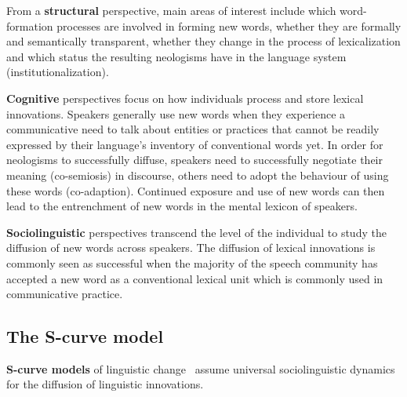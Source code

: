 \documentclass[
  a4paper,
  abstract=on,
  captions=tableabove
  ]{scrartcl}
\renewcommand{\hw}[1]{\textbf{#1}}
\begin{document}
  From a \hw{structural} perspective, main areas of interest include which word-formation processes are involved in forming new words, whether they are formally and semantically transparent, whether they change in the process of lexicalization and which status the resulting neologisms have in the language system (institutionalization). \parencite[e.g.][]{Bauer1983EnglishWordformation, Lipka2005LexicalizationInstitutionalization}

  \hw{Cognitive} perspectives focus on how individuals process and store lexical innovations. Speakers generally use new words when they experience a communicative need to talk about entities or practices that cannot be readily expressed by their language's inventory of conventional words yet. In order for neologisms to successfully diffuse, speakers need to successfully negotiate their meaning (co-semiosis) in discourse, others need to adopt the behaviour of using these words (co-adaption). Continued exposure and use of new words can then lead to the entrenchment of new words in the mental lexicon of speakers.~\parencite{Schmid2008NewWords}

  \hw{Sociolinguistic} perspectives transcend the level of the individual to study the diffusion of new words across speakers. The diffusion of lexical innovations is commonly seen as successful when the majority of the speech community has accepted a new word as a conventional lexical unit which is commonly used in communicative practice.


  \subsection{The S-curve model}
    \label{subsec:s-curve-model}

  \hw{S-curve models} of linguistic change~\parencite{Milroy1992LinguisticVariation, Nevalainen2015DescriptiveAdequacy, Labov2007TransmissionDiffusion} assume universal sociolinguistic dynamics for the diffusion of linguistic innovations.
\end{document}

